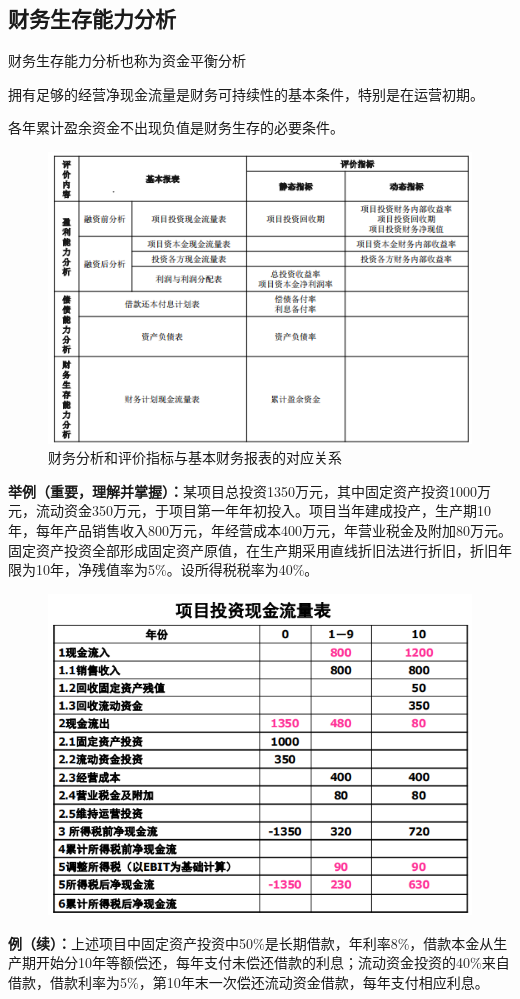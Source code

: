 \subsection{财务生存能力分析}
财务生存能力分析也称为资金平衡分析

拥有足够的经营净现金流量是财务可持续性的基本条件，特别是在运营初期。

各年累计盈余资金不出现负值是财务生存的必要条件。

\begin{figure}[H]
    \centering
    \includegraphics[width=0.6\linewidth]{image/财务分析和评价指标与基本财务报表的对应关系.png}
    \caption{财务分析和评价指标与基本财务报表的对应关系}
\end{figure}

\textbf{举例（重要，理解并掌握）：}某项目总投资1350万元，其中固定资产投资1000万元，流动资金350万元，于项目第一年年初投入。项目当年建成投产，生产期10年，每年产品销售收入800万元，年经营成本400万元，年营业税金及附加80万元。固定资产投资全部形成固定资产原值，在生产期采用直线折旧法进行折旧，折旧年限为10年，净残值率为5\%。设所得税税率为40\%。

\begin{figure}[H]
    \centering
    \includegraphics[width=0.6\linewidth]{image/项目投资现金流量表2.png}
\end{figure}

\textbf{例（续）：}上述项目中固定资产投资中50\%是长期借款，年利率8\%，借款本金从生产期开始分10年等额偿还，每年支付未偿还借款的利息；流动资金投资的40\%来自借款，借款利率为5\%，第10年末一次偿还流动资金借款，每年支付相应利息。

